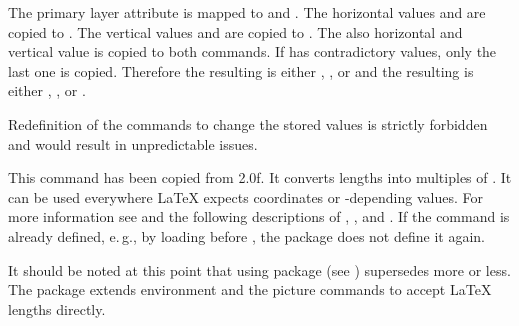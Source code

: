 The primary layer attribute  is mapped to
 and
. The horizontal values  and  are
copied to . The vertical values  and 
are copied to . The also horizontal and vertical value
 is copied to both commands. If  has contradictory
values, only the last one is copied. Therefore the resulting
 is either , , or  and the
resulting  is either , , or .

Redefinition of the commands to change the stored values is strictly forbidden
and would result in unpredictable issues.%
%
%
%
%
%
%


\begin{Declaration}
\end{Declaration}
%
This command has been copied from
 2.0f. It converts lengths into
multiples of . It can be used everywhere \LaTeX{}
expects  coordinates or -depending
values. For more information see \cite{package:eso-pic} and the following
descriptions of , , and . If the
command is already defined, e.\,g., by loading  before
, the package does not define it again.%

It should be noted at this point that using package
 (see
\cite{package:picture}) supersedes  more or less. The package
extends environment  and the picture commands to accept
\LaTeX{} lengths directly.%
%


